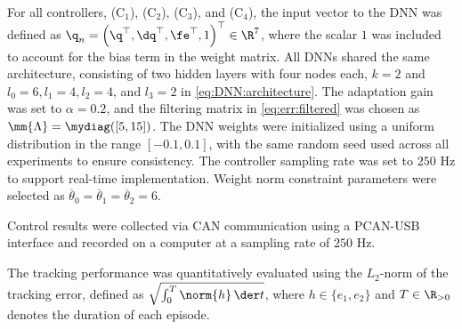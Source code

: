 \documentclass[journal]{IEEEtran}
\begin{document}
\hfill

For all controllers, \ie (C$_1$), (C$_2$), (C$_3$), and (C$_4$), the input vector to the DNN was defined as ${\q}_n=\left(\q^\top,\dq^\top,\fe^\top,1\right)^\top\in\R^{7}$, where the scalar $1$ was included to account for the bias term in the weight matrix.
All DNNs shared the same architecture, consisting of two hidden layers with four nodes each, \ie $k=2$ and $l_0=6, l_1=4, l_2=4$, and $l_3=2$ in \eqref{eq:DNN:architecture}.
The adaptation gain was set to $\alpha = 0.2$, and the filtering matrix in \eqref{eq:err:filtered} was chosen as $\mm{\Lambda}=\mydiag([5,15])$.
The DNN weights were initialized using a uniform distribution in the range $[-0.1, 0.1]$, with the same random seed used across all experiments to ensure consistency.
The controller sampling rate was set to $250$ Hz to support real-time implementation.
Weight norm constraint parameters were selected as $\overline\theta_0=\overline\theta_1=\overline\theta_2=6$.

Control results were collected via CAN communication using a PCAN-USB interface and recorded on a computer at a sampling rate of $250$ Hz.

The tracking performance was quantitatively evaluated using the $L_2$-norm of the tracking error, defined as $\sqrt{\int_0^T\norm{h}\,\der t}$, where $h\in\{e_1,e_2\}$ and $T\in\R_{>0}$ denotes the duration of each episode.
\end{document}
